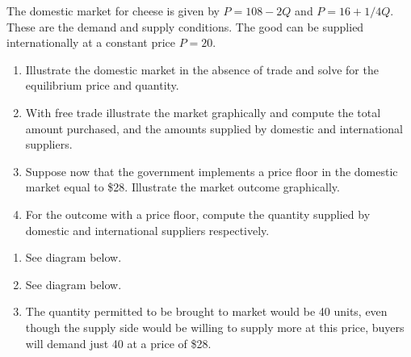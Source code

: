 \begin{enumialphparenastyle}
\begin{ex}
\begin{sol}
\begin{center}
\end{center}
\end{sol}
\end{ex}
	
\begin{ex}\label{ex:ch15ex7}
The domestic market for cheese is given by $P=108-2Q$ and $P=16+1/4Q$. These are the demand and supply conditions. The good can be supplied internationally at a constant price $P=20$.
\begin{enumerate}
\item  Illustrate the domestic market in the absence of trade and solve for the equilibrium price and quantity.
\item  With free trade illustrate the market graphically and compute the total amount purchased, and the amounts supplied by domestic and international suppliers. 
\item  Suppose now that the government implements a price floor in the domestic market equal to \$28. Illustrate the market outcome graphically.
\item  For the outcome with a price floor, compute the quantity supplied by domestic and international suppliers respectively. 
\end{enumerate}
\begin{sol}
\begin{enumerate}
	\item	See diagram below.
	\item	See diagram below.
	\item	The quantity permitted to be brought to market would be 40 units, even though the supply side would be willing to supply more at this price, buyers will demand just 40 at a price of \$28.
\end{enumerate}
\begin{center}
\end{center}
\end{sol}
\end{ex}
\end{enumialphparenastyle}
